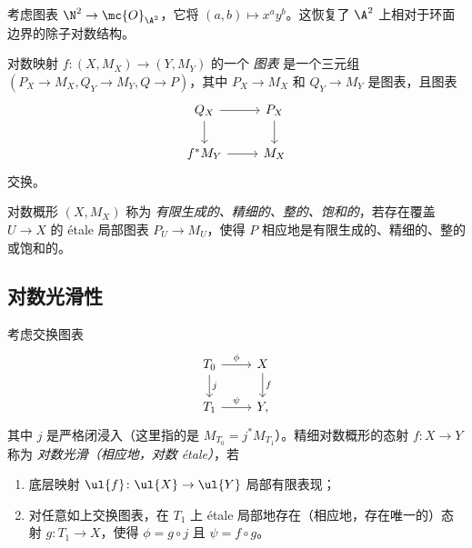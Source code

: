 \begin{exm}
    考虑图表 \(\N^2 \to \mc{O}_{\A^2}\)，它将 \((a,b) \mapsto x^a y^b\)。这恢复了 \(\A^2\) 上相对于环面边界的除子对数结构。
\end{exm}

\begin{defn}
    对数映射 \(f \colon (X, M_X) \to (Y, M_Y)\) 的一个 \textit{图表} 是一个三元组 \((P_X\to M_X, Q_Y \to M_Y, Q \to P)\)，其中 \(P_X \to M_X\) 和 \(Q_Y \to M_Y\) 是图表，且图表
    \begin{equation*}
    \begin{tikzcd}
        Q_X \ar{r} \ar{d} & P_X \ar{d} \\
        f^* M_Y \ar{r} & M_X
    \end{tikzcd}
    \end{equation*}
    交换。
\end{defn}

\begin{defn}
    对数概形 \((X, M_X)\) 称为 \textit{有限生成的、精细的、整的、饱和的}，若存在覆盖 \(U \to X\) 的 \'etale 局部图表 \(P_U \to M_U\)，使得 \(P\) 相应地是有限生成的、精细的、整的或饱和的。
\end{defn}

\subsection{对数光滑性}%
\label{sub:Log smoothness}

\begin{defn}
    考虑交换图表
    \begin{equation*}
    \begin{tikzcd}
        T_0 \ar{r}{\phi} \ar{d}{j} & X \ar{d}{f} \\
        T_1 \ar{r}{\psi} & Y,
    \end{tikzcd}
    \end{equation*}
    其中 \(j\) 是严格闭浸入（这里指的是 \(M_{T_0} = j^* M_{T_1}\)）。精细对数概形的态射 \(f \colon X \to Y\) 称为 \textit{对数光滑（相应地，对数 \'etale）}，若
    \begin{enumerate}
        \item 底层映射 \(\ul{f} \colon \ul{X} \to \ul{Y}\) 局部有限表现；
        \item 对任意如上交换图表，在 \(T_1\) 上 \'etale 局部地存在（相应地，存在唯一的）态射 \(g \colon T_1 \to X\)，使得 \(\phi = g \circ j\) 且 \(\psi = f \circ g\)。
    \end{enumerate}
\end{defn}

